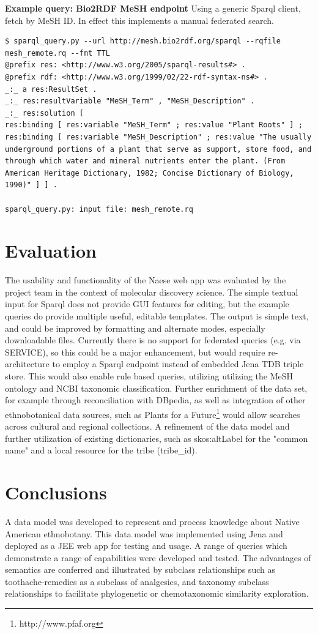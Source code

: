 \documentclass{acm_proc_article-sp}
\begin{document}
\textbf{Example query: Bio2RDF MeSH endpoint}
Using a generic Sparql client, fetch by MeSH ID. In effect this implements a manual federated search.
\begin{lstlisting}
$ sparql_query.py --url http://mesh.bio2rdf.org/sparql --rqfile mesh_remote.rq --fmt TTL
@prefix res: <http://www.w3.org/2005/sparql-results#> .
@prefix rdf: <http://www.w3.org/1999/02/22-rdf-syntax-ns#> .
_:_ a res:ResultSet .
_:_ res:resultVariable "MeSH_Term" , "MeSH_Description" .
_:_ res:solution [
res:binding [ res:variable "MeSH_Term" ; res:value "Plant Roots" ] ;
res:binding [ res:variable "MeSH_Description" ; res:value "The usually underground portions of a plant that serve as support, store food, and through which water and mineral nutrients enter the plant. (From American Heritage Dictionary, 1982; Concise Dictionary of Biology, 1990)" ] ] .

sparql_query.py: input file: mesh_remote.rq
\end{lstlisting}

\section{Evaluation}
The usability and functionality of the Naese web app was evaluated by the project team in the context of molecular discovery science.  The simple textual input for Sparql does not provide GUI features for editing, but the example queries do provide multiple useful, editable templates. The output is simple text, and could be improved by formatting and alternate modes, especially downloadable files. Currently there is no support for federated queries (e.g. via SERVICE), so this could be a major enhancement, but would require re-architecture to employ a Sparql endpoint instead of embedded Jena TDB triple store. This would also enable rule based queries, utilizing utilizing the MeSH ontology and NCBI taxonomic classification. Further enrichment of the data set, for example through reconciliation with DBpedia, as well as integration of other ethnobotanical data sources, such as Plants for a Future\footnote{http://www.pfaf.org} would allow searches across cultural and regional collections. A refinement of the data model and further utilization of existing dictionaries, such as skos:altLabel for the "common name" and a local resource for the tribe (tribe\_id).

\section{Conclusions}
A data model was developed to represent and process knowledge about Native American ethnobotany. This data model was implemented using Jena and deployed as a JEE web app for testing and usage. A range of queries which demonstrate a range of capabilities were developed and tested. The advantages of semantics are conferred and illustrated by subclass relationships such as toothache-remedies as a subclass of analgesics, and taxonomy subclass relationships to facilitate phylogenetic or chemotaxonomic similarity exploration.
\end{document}
